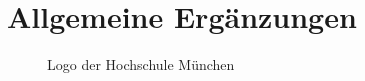 \section{Allgemeine Ergänzungen}

\begin{figure}[H]
	\centering
	\begin{minipage}{0.6\textwidth}
		\centering
	\end{minipage}
	\caption{Logo der Hochschule München}
  	\label{fig:logo_anhang}
\end{figure}